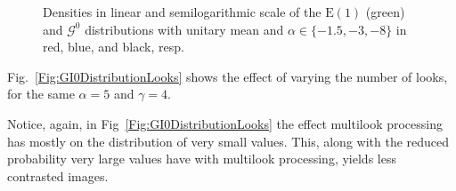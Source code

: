 \documentclass{beamer}
\begin{document}
\begin{frame}[allowframebreaks]
\begin{figure}[hbt]
\centering
{}
\caption[Densities in linear and semilogarithmic scale of the $\text{E}(1)$ (green) and $\mathcal G^0$ distributions with unitary mean]{Densities in linear and semilogarithmic scale of the $\text{E}(1)$ (green) and $\mathcal G^0$ distributions with unitary mean and $\alpha\in\{-1.5,-3,-8\}$ in red, blue, and black, resp.}\label{Fig:GI0Distribution}
\end{figure}

Fig.~\ref{Fig:GI0DistributionLooks} shows the effect of varying the number of looks, for the same $\alpha=5$ and $\gamma=4$.

Notice, again, in Fig~\ref{Fig:GI0DistributionLooks} the effect multilook processing has mostly on the distribution of very small values.
This, along with the reduced probability very large values have with multilook processing, yields less contrasted images.


\end{frame}
\end{document}
